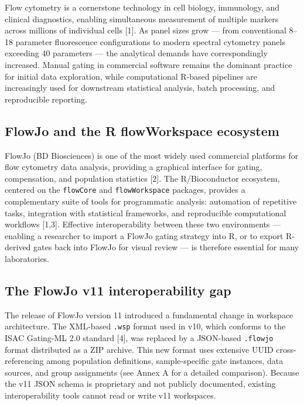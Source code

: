 \documentclass[
]{article}
\begin{document}
Flow cytometry is a cornerstone technology in cell biology, immunology,
and clinical diagnostics, enabling simultaneous measurement of multiple
markers across millions of individual cells {[}1{]}. As panel sizes grow
--- from conventional 8--18 parameter fluorescence configurations to
modern spectral cytometry panels exceeding 40 parameters --- the
analytical demands have correspondingly increased. Manual gating in
commercial software remains the dominant practice for initial data
exploration, while computational R-based pipelines are increasingly used
for downstream statistical analysis, batch processing, and reproducible
reporting.

\subsection{FlowJo and the R flowWorkspace
ecosystem}\label{flowjo-and-the-r-flowworkspace-ecosystem}

FlowJo (BD Biosciences) is one of the most widely used commercial
platforms for flow cytometry data analysis, providing a graphical
interface for gating, compensation, and population statistics {[}2{]}.
The R/Bioconductor ecosystem, centered on the \texttt{flowCore} and
\texttt{flowWorkspace} packages, provides a complementary suite of tools
for programmatic analysis: automation of repetitive tasks, integration
with statistical frameworks, and reproducible computational workflows
{[}1,3{]}. Effective interoperability between these two environments ---
enabling a researcher to import a FlowJo gating strategy into R, or to
export R-derived gates back into FlowJo for visual review --- is
therefore essential for many laboratories.

\subsection{The FlowJo v11 interoperability
gap}\label{the-flowjo-v11-interoperability-gap}

The release of FlowJo version 11 introduced a fundamental change in
workspace architecture. The XML-based \texttt{.wsp} format used in v10,
which conforms to the ISAC Gating-ML 2.0 standard {[}4{]}, was replaced
by a JSON-based \texttt{.flowjo} format distributed as a ZIP archive.
This new format uses extensive UUID cross-referencing among population
definitions, sample-specific gate instances, data sources, and group
assignments (see Annex A for a detailed comparison). Because the v11
JSON schema is proprietary and not publicly documented, existing
interoperability tools cannot read or write v11 workspaces.
\end{document}
